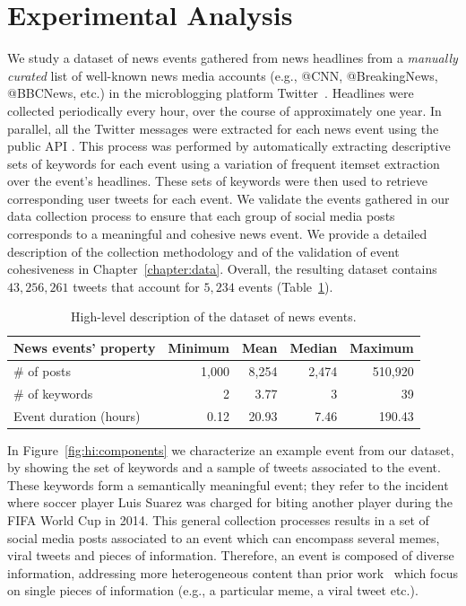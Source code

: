 
\section{Experimental Analysis}

We study a dataset of news events gathered from news headlines from a
\emph{manually curated} list of well-known news media accounts (e.g., @CNN,
@BreakingNews, @BBCNews, etc.) in the microblogging platform
Twitter~\cite{twitter}.
%
Headlines were collected periodically every hour, over the course of
approximately one year. 
%
In parallel, all the Twitter messages were extracted for each news event using
the public API \cite{twitterapi}.
%
This process was performed by automatically extracting descriptive sets of
keywords for each event using a variation of frequent itemset
extraction~\cite{Tan_Steinbach_Kumar} over the event's headlines. 
%
These sets of keywords were then used to retrieve corresponding user tweets for
each event. 
%
We validate the events gathered in our data collection process to ensure that
each group of social media posts corresponds to a meaningful and cohesive news
event. 
%
We provide a detailed description of the collection methodology and of
the validation of event cohesiveness in Chapter~\ref{chapter:data}.
%
Overall, the resulting dataset contains $43,256,261$ tweets that account for
$5,234$ events (Table~\ref{table:hi:dataset-stats}).


\begin{table}
  \centering
  \begin{tabularx}{\textwidth}{@{}p{6cm}rrrr@{}}
    \toprule
    \textbf{News events' property} & \textbf{Minimum} & \textbf{Mean} & \textbf{Median} & \textbf{Maximum} \\ \midrule
    \# of posts & 1,000 & 8,254 & 2,474 & 510,920 \\
    \# of keywords & 2 & 3.77 & 3 & 39 \\
    Event duration (hours) & 0.12 & 20.93 & 7.46 & 190.43 \\ \bottomrule
  \end{tabularx}
  \caption{High-level description of the dataset of news events.} 
  \label{table:hi:dataset-stats}
\end{table}



In Figure~\ref{fig:hi:components} we characterize an example event from our
dataset, by showing the set of keywords and a sample of tweets associated to the
event. 
%
These keywords form a semantically meaningful event; they refer to the incident
where soccer player Luis Suarez was charged for biting another player during the
FIFA World Cup in 2014. 
%
This general collection processes results in a set of social media posts
associated to an event which can encompass several memes, viral tweets and
pieces of information. 
%
Therefore, an event is composed of diverse information, addressing more
heterogeneous content than prior
work~\cite{Castillo:2014,Szabo:2010,Lerman:2010,Tatar:2011,Pinto:2013,Ahmed:2013,suh2010want}
which focus on single pieces of information (e.g., a particular meme, a viral
tweet etc.).


